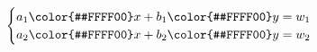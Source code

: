 \documentclass[preview]{standalone}
\begin{document}
\begin{align*}
\begin{cases} a_1 {\color{#FFFF00}x} + b_1 {\color{#FFFF00}y} = w_1 \\ a_2 {\color{#FFFF00}x} + b_2 {\color{#FFFF00}y} = w_2 \end{cases}
\end{align*}
\end{document}
